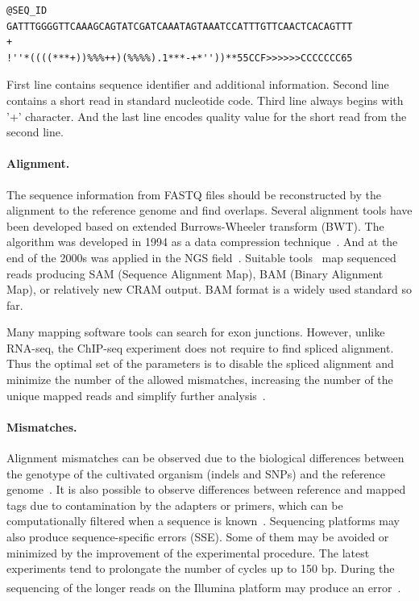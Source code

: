\begin{verbatim}
@SEQ_ID
GATTTGGGGTTCAAAGCAGTATCGATCAAATAGTAAATCCATTTGTTCAACTCACAGTTT
+
!''*((((***+))%%%++)(%%%%).1***-+*''))**55CCF>>>>>>CCCCCCC65
\end{verbatim}

First line contains sequence identifier and additional information.
Second line contains a short read in standard nucleotide code.
Third line always begins with '+' character.
And the last line encodes quality value for the short read from the second line.


\paragraph{Alignment.}
The sequence information from FASTQ files should be reconstructed by the alignment to the reference genome and find overlaps.
Several alignment tools have been developed based on extended Burrows-Wheeler transform (BWT). 
The algorithm was developed in 1994 as a data compression technique~\cite{li2009fast, siren2014indexing}.
And at the end of the 2000s was applied in the NGS field~\cite{simpson2010efficient}.
Suitable tools~\cite{langmead2009ultrafast, li2009fast, kim2019graph} map sequenced reads producing  SAM (Sequence Alignment Map), BAM (Binary Alignment Map), or relatively new CRAM output. 
BAM format is a widely used standard so far.

Many mapping software tools can search for exon junctions. 
However, unlike RNA-seq, the ChIP-seq experiment does not require to find spliced alignment.
Thus the optimal set of the parameters is to disable the spliced alignment and minimize the number of the allowed mismatches, increasing the number of the unique mapped reads and simplify further analysis~\cite{derrien2012fast}.

\paragraph{Mismatches.}
Alignment mismatches can be observed due to the biological differences between the genotype of the cultivated organism (indels and SNPs) and the reference genome~\cite{park2009chip}.
It is also possible to observe differences between reference and mapped tags due to contamination by the adapters or primers, which can be computationally filtered when a sequence is known~\cite{nakamura2011sequence}. 
Sequencing platforms may also produce sequence-specific errors (SSE). 
Some of them may be avoided or minimized by the improvement of the experimental procedure. 
The latest experiments tend to prolongate the number of cycles up to 150 bp. 
During the sequencing of the longer reads on the Illumina\textsuperscript{\texttrademark} platform may produce an error~\cite{nakamura2011sequence}.

